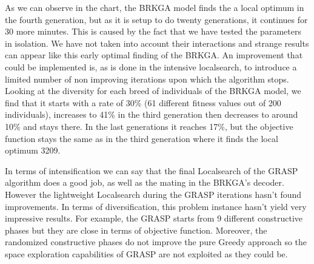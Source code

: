 As we can observe in the chart, the BRKGA model finds the a local optimum in the fourth generation, but as it is setup to do twenty generations, it continues for 30 more minutes. This is caused by the fact that we have tested the parameters in isolation. We have not taken into account their interactions and strange results can appear like this early optimal finding of the BRKGA. An improvement that could be implemented is, as is done in the intensive localsearch, to introduce a limited number of non improving iterations upon which the algorithm stops. 
Looking at the diversity for each breed of individuals of the BRKGA model, we find that it starts with a rate of 30\% (61 different fitness values out of 200 individuals), increases to 41\% in the third generation then decreases to around 10\% and stays there. In the last generations it reaches 17\%, but the objective function stays the same as in the third generation where it finds the local optimum 3209.

In terms of intensification we can say that the final Localsearch of the GRASP algorithm does a good job, as well as the mating in the BRKGA's decoder. However the lightweight Localsearch during the GRASP iterations hasn't found improvements. 
In terms of diversification, this problem instance hasn't yield very impressive results. For example, the GRASP starts from 9 different constructive phases but they are close in terms of objective function. Moreover, the randomized constructive phases do not improve the pure Greedy approach so the space exploration capabilities of GRASP are not exploited as they could be. 

\pagebreak